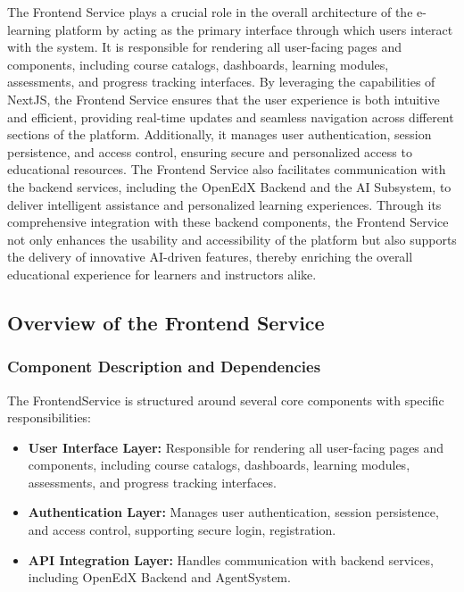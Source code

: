 \documentclass[../Main.tex]{subfiles}
\begin{document}
{{	The Frontend Service plays a crucial role in the overall architecture of the e-learning
	platform by acting as the primary interface through which users interact with the
	system. It is responsible for rendering all user-facing pages and components, including
	course catalogs, dashboards, learning modules, assessments, and progress tracking
	interfaces. By leveraging the capabilities of NextJS, the Frontend Service ensures
	that the user experience is both intuitive and efficient, providing real-time
	updates and seamless navigation across different sections of the platform. Additionally,
	it manages user authentication, session persistence, and access control, ensuring
	secure and personalized access to educational resources. The Frontend Service
	also facilitates communication with the backend services, including the OpenEdX
	Backend and the AI Subsystem, to deliver intelligent assistance and
	personalized learning experiences. Through its comprehensive integration with these
	backend components, the Frontend Service not only enhances the usability and
	accessibility of the platform but also supports the delivery of innovative AI-driven
	features, thereby enriching the overall educational experience for learners and
	instructors alike.

	\subsection{Overview of the Frontend Service}
	\label{section:4.3.1.1_overview_of_the_frontend_service}
	\subsubsection{Component Description and Dependencies}
	\label{section:4.3.1.1_component_description_and_dependencies} The FrontendService
	is structured around several core components with specific responsibilities:

	\begin{itemize}
		\item \textbf{User Interface Layer:} Responsible for rendering all user-facing
			pages and components, including course catalogs, dashboards, learning modules,
			assessments, and progress tracking interfaces.

		\item \textbf{Authentication Layer:} Manages user authentication, session persistence,
			and access control, supporting secure login, registration.

		\item \textbf{API Integration Layer:} Handles communication with backend
			services, including OpenEdX Backend and AgentSystem.
	\end{itemize}

}}
\end{document}
